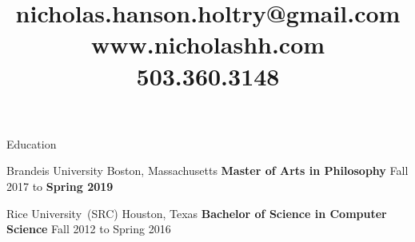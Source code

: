 \documentclass{resume}
\title{%
nicholas.hanson.holtry@gmail.com \\
www.nicholashh.com \\
503.360.3148}
\begin{document}





\begin{rSection}{Education}


  \begin{rSubSection}
  {Brandeis \normalfont University}
  {Boston, Massachusetts}
  {\bf Master \normalfont of Arts in \bf Philosophy}
  {Fall 2017 to \bf{Spring 2019}}%
  \iftoggle{cv}{
    \item Thesis:~``Reasoning First Rationality''
    \item Advisors:~Dr.~Berislav Maru{\v s}i{\' c}, Dr.~Eli Hirsch
    \item Philosophy GPA:~\tab{$4.00/4.00$}
    \item Overall GPA:~\tab{$3.97/4.00$}
  }{
    \item GPA:~$3.97/4.00$
  }
  \end{rSubSection}

  \begin{rSubSection}
  {Rice \normalfont University~(SRC)}
  {Houston, Texas}
  {\bf Bachelor \normalfont of Science in \bf Computer Science}
  {Fall 2012 to Spring 2016}%
  \iftoggle{cv}{
    \item Comp Sci GPA:~\tab{$3.68/4.00$}
    \item Overall GPA:~\tab{$3.61/4.00$}
  }{
    \item GPA:~$3.61/4.00$
  }
  \end{rSubSection}










\end{rSection}
\end{document}
